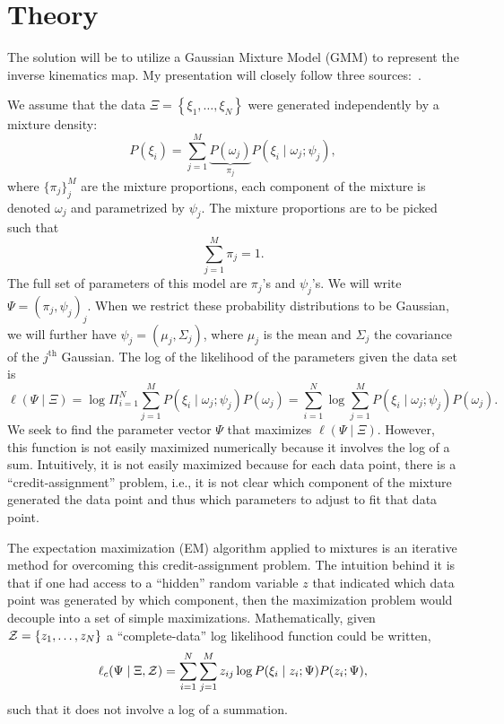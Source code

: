 \section{Theory}
\label{sec:theory}

The solution will be to utilize a Gaussian Mixture Model (GMM) to represent the
inverse kinematics map. My presentation will closely follow three
sources:~\cite{mclachlan2007algorithm,ghahramani1993solving,xu2017data}.

We assume that the data $\Xi = \left\{ \xi_1, \ldots, \xi_N \right\}$ were
generated independently by a mixture density:
%
\begin{equation}
    P(\xi_i) = \sum_{j=1}^M \underbrace{P(\omega_j)}_{\pi_j} 
        P(\xi_i \mid \omega_j; \psi_j),
    \label{eq:mixture_density}
\end{equation}
%
where $\{\pi_j\}_j^M$ are the mixture proportions, each component of the mixture
is denoted $\omega_j$ and parametrized by $\psi_j$. The mixture proportions are
to be picked such that \[ \sum_{j=1}^M \pi_j = 1. \] The full set of parameters
of this model are $\pi_j$'s and $\psi_j$'s. We will write $\Psi = (\pi_j,
\psi_j)_j$. When we restrict these probability distributions to be Gaussian, we
will further have $\psi_j = (\mu_j, \Sigma_j)$, where $\mu_j$ is the mean and
$\Sigma_j$ the covariance of the $j^{\textrm{th}}$ Gaussian. The log of the
likelihood of the parameters given the data set is
%
\begin{equation}
    \ell(\Psi \mid \Xi) = \log{ \Pi_{i=1}^N \sum_{j=1}^M P(\xi_i \mid \omega_j; 
    \psi_j) P(\omega_j) } = \sum_{i=1}^N \log{ \sum_{j=1}^M 
    P(\xi_i \mid \omega_j; \psi_j) P(\omega_j). }
    \label{eq:loglike}
\end{equation}
%
We seek to find the parameter vector $\Psi$ that maximizes $\ell(\Psi \mid
\Xi)$. However, this function is not easily maximized numerically because it
involves the log of a sum. Intuitively, it is not easily maximized because for
each data point, there is a ``credit-assignment'' problem, i.e., it is not clear
which component of the mixture generated the data point and thus which
parameters to adjust to fit that data point.

The expectation maximization (EM) algorithm applied to mixtures is an iterative
method for overcoming this credit-assignment problem. The intuition behind it is
that if one had access to a ``hidden'' random variable $z$ that indicated which
data point was generated by which component, then the maximization problem would
decouple into a set of simple maximizations. Mathematically, given $\mathcal{Z} =
\{z_1, \ldots, z_N \}$ a ``complete-data'' log likelihood function could be
written,
%
\begin{equation}
    \ell_c(\Psi \mid \Xi, \mathcal{Z}) = \sum_{i=1}^N \sum_{j=1}^M z_{ij} \log{
        P(\xi_i \mid z_i; \Psi)P(z_i; \Psi),
    }
    \label{eq:complete_loglike}
\end{equation}
%
such that it does not involve a log of a summation.

